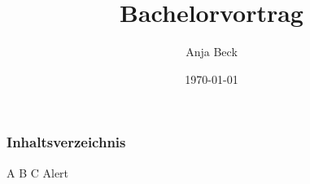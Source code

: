 \documentclass{beamer}
\title{Bachelorvortrag}
\author{Anja Beck}
\date{\today}
\institute{Fakultät Physik}
\begin{document}
\begin{frame}
	\titlepage
\end{frame}
\begin{frame}
	\frametitle{Inhaltsverzeichnis}
	\tableofcontents
\end{frame}
\begin{frame}
	A
	\pause
	B
	\pause
	C
	\pause
	\pause
	\alert{Alert}
\end{frame}
\end{document}

